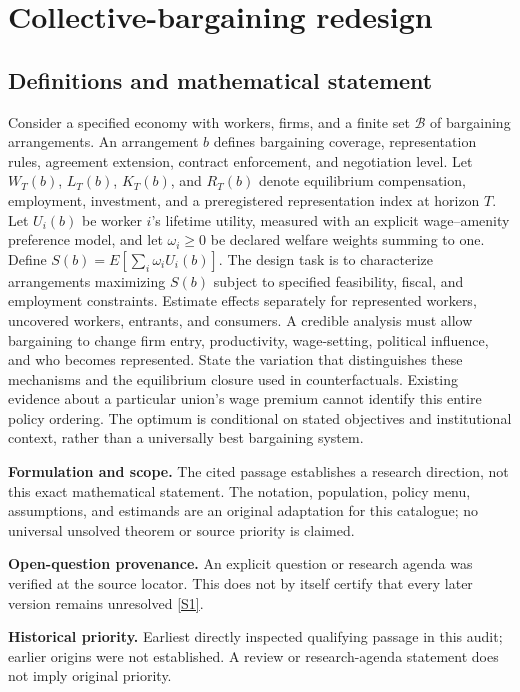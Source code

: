 \documentclass[11pt]{article}
\newcommand{\sref}[2]{\hyperlink{source:#1:#2}{[S#2]}}
\begin{document}
\section*{Collective-bargaining redesign}\label{30007636}
\subsection{Definitions and mathematical statement}
Consider a specified economy with workers, firms, and a finite set \(\mathcal B\) of bargaining arrangements. An arrangement \(b\) defines bargaining coverage, representation rules, agreement extension, contract enforcement, and negotiation level. Let \(W_T(b)\), \(L_T(b)\), \(K_T(b)\), and \(R_T(b)\) denote equilibrium compensation, employment, investment, and a preregistered representation index at horizon \(T\). Let \(U_i(b)\) be worker \(i\)'s lifetime utility, measured with an explicit wage--amenity preference model, and let \(\omega_i\ge0\) be declared welfare weights summing to one. Define \(S(b)=E[\sum_i\omega_iU_i(b)]\). The design task is to characterize arrangements maximizing \(S(b)\) subject to specified feasibility, fiscal, and employment constraints. Estimate effects separately for represented workers, uncovered workers, entrants, and consumers. A credible analysis must allow bargaining to change firm entry, productivity, wage-setting, political influence, and who becomes represented. State the variation that distinguishes these mechanisms and the equilibrium closure used in counterfactuals. Existing evidence about a particular union's wage premium cannot identify this entire policy ordering. The optimum is conditional on stated objectives and institutional context, rather than a universally best bargaining system.

\par\textbf{Formulation and scope.} The cited passage establishes a research direction, not this exact mathematical statement. The notation, population, policy menu, assumptions, and estimands are an original adaptation for this catalogue; no universal unsolved theorem or source priority is claimed.

\par\textbf{Open-question provenance.} An explicit question or research agenda was verified at the source locator. This does not by itself certify that every later version remains unresolved \sref{30007636}{1}.

\par\textbf{Historical priority.} Earliest directly inspected qualifying passage in this audit; earlier origins were not established. A review or research-agenda statement does not imply original priority.
\end{document}

